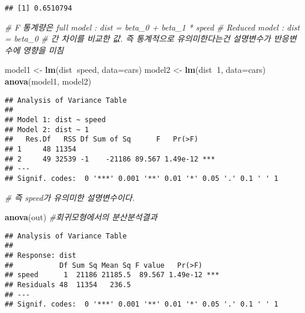 \documentclass[]{article}
\newenvironment{Shaded}{\begin{snugshade}}{\end{snugshade}}
\newcommand{\KeywordTok}[1]{\textcolor[rgb]{0.13,0.29,0.53}{\textbf{#1}}}
\newcommand{\DataTypeTok}[1]{\textcolor[rgb]{0.13,0.29,0.53}{#1}}
\newcommand{\DecValTok}[1]{\textcolor[rgb]{0.00,0.00,0.81}{#1}}
\newcommand{\StringTok}[1]{\textcolor[rgb]{0.31,0.60,0.02}{#1}}
\newcommand{\CommentTok}[1]{\textcolor[rgb]{0.56,0.35,0.01}{\textit{#1}}}
\newcommand{\OperatorTok}[1]{\textcolor[rgb]{0.81,0.36,0.00}{\textbf{#1}}}
\newcommand{\NormalTok}[1]{#1}
\begin{document}
\begin{Shaded}
\end{Shaded}

\begin{verbatim}
## [1] 0.6510794
\end{verbatim}

\begin{Shaded}
\begin{Highlighting}[]
\CommentTok{# F 통계량은 full model : dist = beta_0 + beta_1 * speed}
\CommentTok{#            Reduced model : dist = beta_0 }
\CommentTok{# 간 차이를 비교한 값. 즉 통계적으로 유의미한다는건 설명변수가 반응변수에 영향을 미침}

\NormalTok{model1 <-}\StringTok{ }\KeywordTok{lm}\NormalTok{(dist}\OperatorTok{~}\NormalTok{speed, }\DataTypeTok{data=}\NormalTok{cars)}
\NormalTok{model2 <-}\StringTok{ }\KeywordTok{lm}\NormalTok{(dist}\OperatorTok{~}\DecValTok{1}\NormalTok{, }\DataTypeTok{data=}\NormalTok{cars)}
\KeywordTok{anova}\NormalTok{(model1, model2)}
\end{Highlighting}
\end{Shaded}

\begin{verbatim}
## Analysis of Variance Table
## 
## Model 1: dist ~ speed
## Model 2: dist ~ 1
##   Res.Df   RSS Df Sum of Sq      F   Pr(>F)    
## 1     48 11354                                 
## 2     49 32539 -1    -21186 89.567 1.49e-12 ***
## ---
## Signif. codes:  0 '***' 0.001 '**' 0.01 '*' 0.05 '.' 0.1 ' ' 1
\end{verbatim}

\begin{Shaded}
\begin{Highlighting}[]
\CommentTok{# 즉 speed가 유의미한 설명변수이다. }

\KeywordTok{anova}\NormalTok{(out) }\CommentTok{#회귀모형에서의 분산분석결과}
\end{Highlighting}
\end{Shaded}

\begin{verbatim}
## Analysis of Variance Table
## 
## Response: dist
##           Df Sum Sq Mean Sq F value   Pr(>F)    
## speed      1  21186 21185.5  89.567 1.49e-12 ***
## Residuals 48  11354   236.5                     
## ---
## Signif. codes:  0 '***' 0.001 '**' 0.01 '*' 0.05 '.' 0.1 ' ' 1
\end{verbatim}
\end{document}
